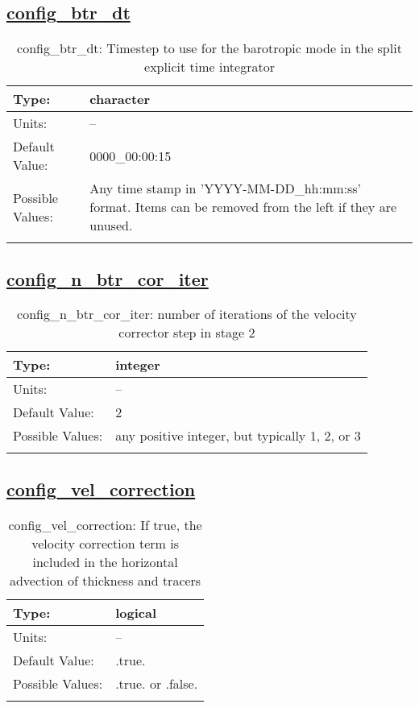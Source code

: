 \subsection[config\_btr\_dt]{\hyperref[sec:nm_tab_split_explicit_ts]{config\_btr\_dt}}
\label{subsec:nm_sec_config_btr_dt}
\begin{center}
\begin{longtable}{| p{2.0in} || p{4.0in} |}
    \hline
    Type: & character \\
    \hline
    Units: & -- \\
    \hline
    Default Value: & 0000\_00:00:15 \\
    \hline
    Possible Values: & Any time stamp in 'YYYY-MM-DD\_hh:mm:ss' format. Items can be removed from the left if they are unused. \\
    \hline
    \caption{config\_btr\_dt: Timestep to use for the barotropic mode in the split explicit time integrator}
\end{longtable}
\end{center}
\subsection[config\_n\_btr\_cor\_iter]{\hyperref[sec:nm_tab_split_explicit_ts]{config\_n\_btr\_cor\_iter}}
\label{subsec:nm_sec_config_n_btr_cor_iter}
\begin{center}
\begin{longtable}{| p{2.0in} || p{4.0in} |}
    \hline
    Type: & integer \\
    \hline
    Units: & -- \\
    \hline
    Default Value: & 2 \\
    \hline
    Possible Values: & any positive integer, but typically 1, 2, or 3 \\
    \hline
    \caption{config\_n\_btr\_cor\_iter: number of iterations of the velocity corrector step in stage 2}
\end{longtable}
\end{center}
\subsection[config\_vel\_correction]{\hyperref[sec:nm_tab_split_explicit_ts]{config\_vel\_correction}}
\label{subsec:nm_sec_config_vel_correction}
\begin{center}
\begin{longtable}{| p{2.0in} || p{4.0in} |}
    \hline
    Type: & logical \\
    \hline
    Units: & -- \\
    \hline
    Default Value: & .true. \\
    \hline
    Possible Values: & .true. or .false. \\
    \hline
    \caption{config\_vel\_correction: If true, the velocity correction term is included in the horizontal advection of thickness and tracers}
\end{longtable}
\end{center}
